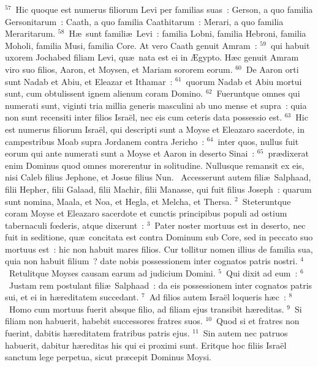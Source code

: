${}^{57}$~Hic quoque est numerus filiorum Levi per familias suas~: Gerson, a quo familia Gersonitarum~: Caath, a quo familia Caathitarum~: Merari, a quo familia Meraritarum.
${}^{58}$~H\ae\ sunt famili\ae\ Levi~: familia Lobni, familia Hebroni, familia Moholi, familia Musi, familia Core. At vero Caath genuit Amram~:
${}^{59}$~qui habuit uxorem Jochabed filiam Levi, qu\ae\ nata est ei in \AE gypto. H\ae c genuit Amram viro suo filios, Aaron, et Moysen, et Mariam sororem eorum.
${}^{60}$~De Aaron orti sunt Nadab et Abiu, et Eleazar et Ithamar~:
${}^{61}$~quorum Nadab et Abiu mortui sunt, cum obtulissent ignem alienum coram Domino.
${}^{62}$~Fueruntque omnes qui numerati sunt, viginti tria millia generis masculini ab uno mense et supra~: quia non sunt recensiti inter filios Isra\"el, nec eis cum ceteris data possessio est.
${}^{63}$~Hic est numerus filiorum Isra\"el, qui descripti sunt a Moyse et Eleazaro sacerdote, in campestribus Moab supra Jordanem contra Jericho~:
${}^{64}$~inter quos, nullus fuit eorum qui ante numerati sunt a Moyse et Aaron in deserto Sinai~:
${}^{65}$~pr\ae dixerat enim Dominus quod omnes morerentur in solitudine. Nullusque remansit ex eis, nisi Caleb filius Jephone, et Josue filius Nun.
~\lettrine[lines=10,image=true,loversize=0.05,lraise=-0.03]{A}{}ccesserunt autem fili\ae\ Salphaad, filii Hepher, filii Galaad, filii Machir, filii Manasse, qui fuit filius Joseph~: quarum sunt nomina, Maala, et Noa, et Hegla, et Melcha, et Thersa.
${}^{2}$~Steteruntque coram Moyse et Eleazaro sacerdote et cunctis principibus populi ad ostium tabernaculi fœderis, atque dixerunt~:
${}^{3}$~Pater noster mortuus est in deserto, nec fuit in seditione, qu\ae\ concitata est contra Dominum sub Core, sed in peccato suo mortuus est~: hic non habuit mares filios. Cur tollitur nomen illius de familia sua, quia non habuit filium~? date nobis possessionem inter cognatos patris nostri.
${}^{4}$~Retulitque Moyses causam earum ad judicium Domini.
${}^{5}$~Qui dixit ad eum~:
${}^{6}$~Justam rem postulant fili\ae\ Salphaad~: da eis possessionem inter cognatos patris sui, et ei in h\ae reditatem succedant.
${}^{7}$~Ad filios autem Isra\"el loqueris h\ae c~:
${}^{8}$~Homo cum mortuus fuerit absque filio, ad filiam ejus transibit h\ae reditas.
${}^{9}$~Si filiam non habuerit, habebit successores fratres suos.
${}^{10}$~Quod si et fratres non fuerint, dabitis h\ae reditatem fratribus patris ejus.
${}^{11}$~Sin autem nec patruos habuerit, dabitur h\ae reditas his qui ei proximi sunt. Eritque hoc filiis Isra\"el sanctum lege perpetua, sicut pr\ae cepit Dominus Moysi.


